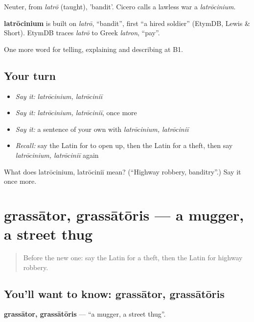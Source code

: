 Neuter, from \emph{latrō} (taught), 'bandit'. Cicero calls a lawless war a \emph{latrōcinium}.

\begin{cousinweb}
\textbf{latrōcinium} is built on \emph{latrō}, \textquotedblleft{}bandit\textquotedblright{}, first \textquotedblleft{}a hired soldier\textquotedblright{} (EtymDB, Lewis \& Short). EtymDB traces \emph{latrō} to Greek \emph{latron}, \textquotedblleft{}pay\textquotedblright{}.
\end{cousinweb}

\begin{grammarlens}[title={What you've built}]
One more word for telling, explaining and describing at B1.
\end{grammarlens}

\subsection*{Your turn}
\begin{itemize}
\raggedright
  \item \emph{Say it:} \emph{latrōcinium, latrōciniī}
  \item \emph{Say it:} \emph{latrōcinium, latrōciniī}, once more
  \item \emph{Say it:} a sentence of your own with \emph{latrōcinium, latrōciniī}
  \item \emph{Recall:} say the Latin for to open up, then the Latin for a theft, then say \emph{latrōcinium, latrōciniī} again
\end{itemize}

\begin{tcolorbox}[breakable,colback=teal!4,colframe=teal!35!black,title={Before you move on}]
What does latrōcinium, latrōciniī mean? (\textquotedblleft{}Highway robbery, banditry\textquotedblright{}.) Say it once more.
\end{tcolorbox}
\section[grassātor, grassātōris]{grassātor, grassātōris — a mugger, a street thug}

\label{lesson:LA-C303-grassator}



\begin{quote}
Before the new one: say the Latin for a theft, then the Latin for highway robbery.
\end{quote}

\subsection*{You'll want to know: grassātor, grassātōris}
\textbf{grassātor, grassātōris} — \textquotedblleft{}a mugger, a street thug\textquotedblright{}.

